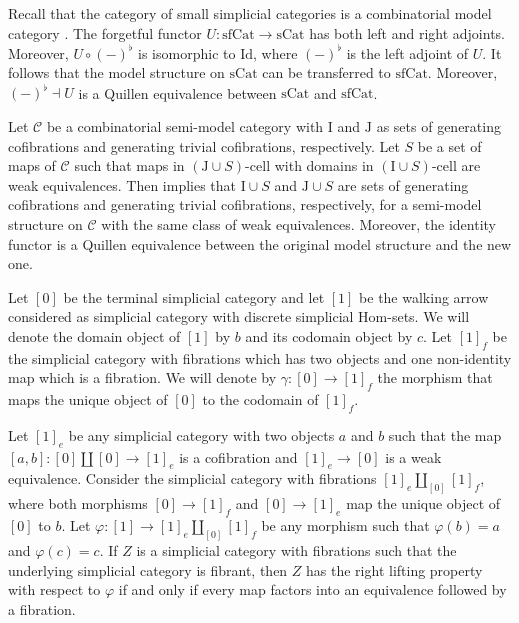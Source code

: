 \documentclass[reqno]{amsart}
\theoremstyle{definition}
\theoremstyle{remark}
\newcommand{\fs}[1]{\mathrm{#1}}
\newcommand{\Hom}{\fs{Hom}}
\newcommand{\cat}[1]{\mathcal{#1}}
\newcommand{\C}{\cat{C}}
\newcommand{\Id}{\fs{Id}}
\newcommand{\sCat}{\fs{sCat}}
\newcommand{\sfCat}{\fs{sfCat}}
\newcommand{\I}{\fs{I}}
\newcommand{\J}{\fs{J}}
\newcommand{\class}[2]{#1\text{-}\mathrm{#2}}
\newcommand{\Icell}[1][\I]{\class{#1}{cell}}
\numberwithin{figure}{section}
\begin{document}
Recall that the category of small simplicial categories is a combinatorial model category \cite[Proposition~A.3.2.4]{lurie-topos}.
The forgetful functor $U : \sfCat \to \sCat$ has both left and right adjoints.
Moreover, $U \circ (-)^\flat$ is isomorphic to $\Id$, where $(-)^\flat$ is the left adjoint of $U$.
It follows that the model structure on $\sCat$ can be transferred to $\sfCat$.
Moreover, $(-)^\flat \dashv U$ is a Quillen equivalence between $\sCat$ and $\sfCat$.

Let $\C$ be a combinatorial semi-model category with $\I$ and $\J$ as sets of generating cofibrations and generating trivial cofibrations, respectively.
Let $S$ be a set of maps of $\C$ such that maps in $\Icell[(\J \cup S)]$ with domains in $\Icell[(\I \cup S)]$ are weak equivalences.
Then  implies that $\I \cup S$ and $\J \cup S$ are sets of generating cofibrations and generating trivial cofibrations, respectively, for a semi-model structure on $\C$ with the same class of weak equivalences.
Moreover, the identity functor is a Quillen equivalence between the original model structure and the new one.

Let $[0]$ be the terminal simplicial category and let $[1]$ be the walking arrow considered as simplicial category with discrete simplicial $\Hom$-sets.
We will denote the domain object of $[1]$ by $b$ and its codomain object by $c$.
Let $[1]_f$ be the simplicial category with fibrations which has two objects and one non-identity map which is a fibration.
We will denote by $\gamma : [0] \to [1]_f$ the morphism that maps the unique object of $[0]$ to the codomain of $[1]_f$.

Let $[1]_e$ be any simplicial category with two objects $a$ and $b$ such that the map $[a,b] : [0] \amalg [0] \to [1]_e$ is a cofibration and $[1]_e \to [0]$ is a weak equivalence.
Consider the simplicial category with fibrations $[1]_e \amalg_{[0]} [1]_f$, where both morphisms $[0] \to [1]_f$ and $[0] \to [1]_e$ map the unique object of $[0]$ to $b$.
Let $\varphi : [1] \to [1]_e \amalg_{[0]} [1]_f$ be any morphism such that $\varphi(b) = a$ and $\varphi(c) = c$.
If $Z$ is a simplicial category with fibrations such that the underlying simplicial category is fibrant, then $Z$ has the right lifting property with respect to $\varphi$ if and only if every map factors into an equivalence followed by a fibration.
\end{document}
